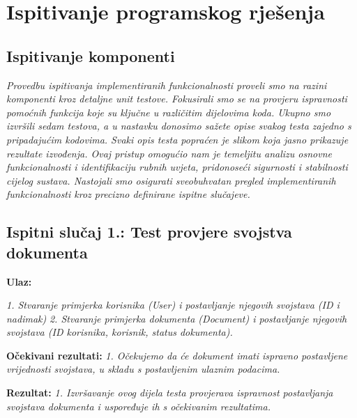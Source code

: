 	
		\section{Ispitivanje programskog rješenja}
			

			
			\subsection{Ispitivanje komponenti}

			 \textit{Provedbu ispitivanja implementiranih funkcionalnosti proveli smo na razini komponenti kroz detaljne unit testove. Fokusirali smo se na provjeru ispravnosti pomoćnih funkcija koje su ključne u različitim dijelovima koda. Ukupno smo izvršili sedam testova, a u nastavku donosimo sažete opise svakog testa zajedno s pripadajućim kodovima. Svaki opis testa popraćen je slikom koja jasno prikazuje rezultate izvođenja. Ovaj pristup omogućio nam je temeljitu analizu osnovne funkcionalnosti i identifikaciju rubnih uvjeta, pridonoseći sigurnosti i stabilnosti cijelog sustava. Nastojali smo osigurati sveobuhvatan pregled implementiranih funkcionalnosti kroz precizno definirane ispitne slučajeve.}


            \subsection{Ispitni slučaj 1.: Test provjere svojstva dokumenta}

                        \textbf{Ulaz:}

                        \textit{1. Stvaranje primjerka korisnika (User) i postavljanje njegovih svojstava (ID i nadimak)}
                        \textit{2. Stvaranje primjerka dokumenta (Document) i postavljanje njegovih svojstava (ID korisnika, korisnik, status dokumenta).}

                        \textbf{Očekivani rezultati:}
                        \textit{1. Očekujemo da će dokument imati ispravno postavljene vrijednosti svojstava, u skladu s postavljenim ulaznim podacima.}

                        \textbf{Rezultat:}
                        \textit{1. Izvršavanje ovog dijela testa provjerava ispravnost postavljanja svojstava dokumenta i uspoređuje ih s očekivanim rezultatima.}

